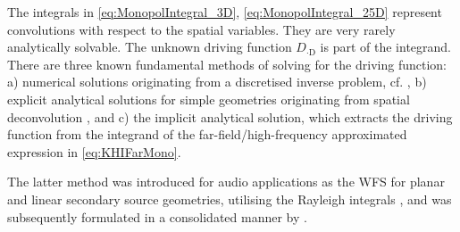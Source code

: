 The integrals in
\myeqn\eqref{eq:MonopolIntegral_3D}, \eqref{eq:MonopolIntegral_25D}
represent convolutions with respect to the spatial variables.
%
They are very rarely analytically solvable.
%
The unknown driving function $D_{\cdot\text{D}}$ is part of the integrand.
%
There are three known fundamental methods of solving for the driving
function:
%
a) numerical solutions originating from a discretised inverse problem, cf.
\cite{Ise1999,Kolundzija2009a,Bai2015_JASA,Koyama2020_IEEE},
b) explicit analytical solutions for simple geometries originating from
spatial deconvolution \cite{Ahrens2008_Acta,Spors2010a,Ahrens2010_IEEE,
Fazi2010,Koyama2013},
and c) the implicit analytical solution, which extracts the driving function
from the integrand of the far-field/high-frequency approximated expression
in \myeq\eqref{eq:KHIFarMono}.



The latter method was introduced for audio applications as the WFS for planar
and linear secondary source geometries, utilising the Rayleigh integrals
\cite[Ch.~25.5]{Skudrzyk1971}, and was subsequently formulated in
a consolidated manner by \cite{Start1997_diss,Verheijen1997_diss,Voelk2012,
Zotter2013,Firtha2019_diss,ZotterSchultz2020_White}.



